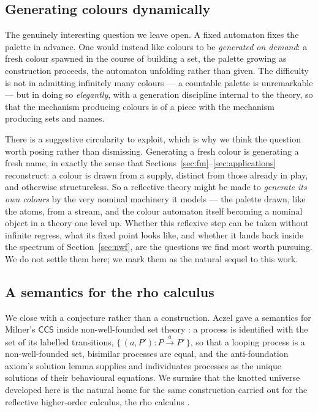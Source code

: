 \subsection{Generating colours dynamically}
\label{sec:future:dynamic}

The genuinely interesting question we leave open. A fixed automaton fixes the
palette in advance. One would instead like colours to be \emph{generated on
demand}: a fresh colour spawned in the course of building a set, the palette
growing as construction proceeds, the automaton unfolding rather than given. The
difficulty is not in admitting infinitely many colours --- a countable palette is
unremarkable --- but in doing so \emph{elegantly}, with a generation discipline
internal to the theory, so that the mechanism producing colours is of a piece with
the mechanism producing sets and names.

There is a suggestive circularity to exploit, which is why we think the question
worth posing rather than dismissing. Generating a fresh colour is generating a
fresh name, in exactly the sense that
Sections~\ref{sec:fm}--\ref{sec:applications} reconstruct: a colour is drawn from
a supply, distinct from those already in play, and otherwise structureless. So a
reflective theory might be made to \emph{generate its own colours} by the very
nominal machinery it models --- the palette drawn, like the atoms, from a stream,
and the colour automaton itself becoming a nominal object in a theory one level
up. Whether this reflexive step can be taken without infinite regress, what its
fixed point looks like, and whether it lands back inside the spectrum of
Section~\ref{sec:nwf}, are the questions we find most worth pursuing. We do not
settle them here; we mark them as the natural sequel to this work.

\subsection{A semantics for the rho calculus}
\label{sec:future:rho}

We close with a conjecture rather than a construction. Aczel gave a semantics for
Milner's $\mathsf{CCS}$ inside non-well-founded set theory \cite{aczel1988nwf}: a
process is identified with the set of its labelled transitions,
$\{\,(a,P') : P \xrightarrow{a} P'\,\}$, so that a looping process is a
non-well-founded set, bisimilar processes are equal, and the anti-foundation
axiom's solution lemma supplies and individuates processes as the unique
solutions of their behavioural equations. We surmise that the knotted universe
developed here is the natural home for the same construction carried out for the
reflective higher-order calculus, the rho calculus
\cite{DBLP:journals/entcs/MeredithR05}.


